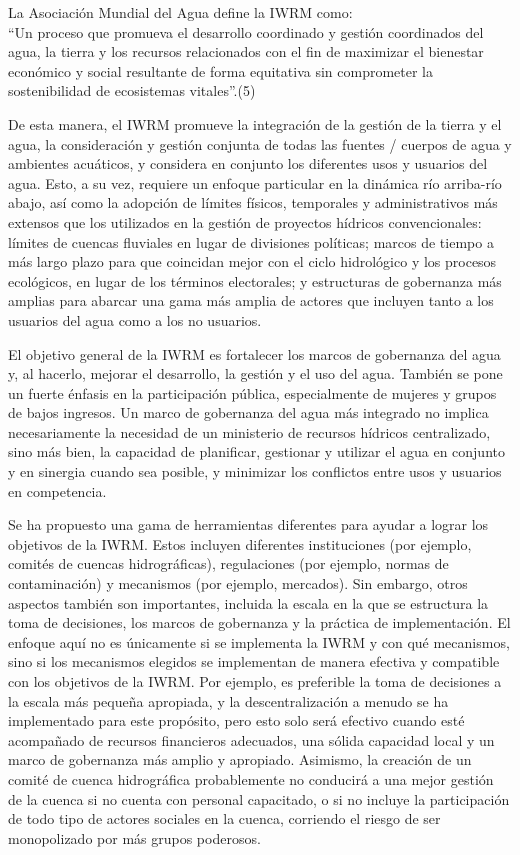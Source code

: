     \setlength{\leftskip}{1cm}
        La Asociación Mundial del Agua define la IWRM como:\\
        ``Un proceso que promueva el desarrollo coordinado y gestión coordinados del agua, la tierra y los recursos relacionados con el fin de maximizar el bienestar económico y social resultante de forma equitativa sin comprometer la sostenibilidad de ecosistemas vitales''.(5)
    \setlength{\leftskip}{0cm}

    De esta manera, el IWRM promueve la integración de la gestión de la tierra y el agua, la consideración y gestión conjunta de todas las fuentes / cuerpos de agua y ambientes acuáticos, y considera en conjunto los diferentes usos y usuarios del agua. Esto, a su vez, requiere un enfoque particular en la dinámica río arriba-río abajo, así como la adopción de límites físicos, temporales y administrativos más extensos que los utilizados en la gestión de proyectos hídricos convencionales: límites de cuencas fluviales en lugar de divisiones políticas; marcos de tiempo a más largo plazo para que coincidan mejor con el ciclo hidrológico y los procesos ecológicos, en lugar de los términos electorales; y estructuras de gobernanza más amplias para abarcar una gama más amplia de actores que incluyen tanto a los usuarios del agua como a los no usuarios.

    El objetivo general de la IWRM  es fortalecer los marcos de gobernanza del agua y, al hacerlo, mejorar el desarrollo, la gestión y el uso del agua. También se pone un fuerte énfasis en la participación pública, especialmente de mujeres y grupos de bajos ingresos. Un marco de gobernanza del agua más integrado no implica necesariamente la necesidad de un ministerio de recursos hídricos centralizado, sino más bien, la capacidad de planificar, gestionar y utilizar el agua en conjunto y en sinergia cuando sea posible, y minimizar los conflictos entre usos y usuarios en competencia.

    Se ha propuesto una gama de herramientas diferentes para ayudar a lograr los objetivos de la IWRM. Estos incluyen diferentes instituciones (por ejemplo, comités de cuencas hidrográficas), regulaciones (por ejemplo, normas de contaminación) y mecanismos (por ejemplo, mercados). Sin embargo, otros aspectos también son importantes, incluida la escala en la que se estructura la toma de decisiones, los marcos de gobernanza y la práctica de implementación. El enfoque aquí no es únicamente si se implementa la IWRM y con qué mecanismos, sino si los mecanismos elegidos se implementan de manera efectiva y compatible con los objetivos de la IWRM. Por ejemplo, es preferible la toma de decisiones a la escala más pequeña apropiada, y la descentralización a menudo se ha implementado para este propósito, pero esto solo será efectivo cuando esté acompañado de recursos financieros adecuados, una sólida capacidad local y un marco de gobernanza más amplio y apropiado. Asimismo, la creación de un comité de cuenca hidrográfica probablemente no conducirá a una mejor gestión de la cuenca si no cuenta con personal capacitado, o si no incluye la participación de todo tipo de actores sociales en la cuenca, corriendo el riesgo de ser monopolizado por más grupos poderosos.
    
